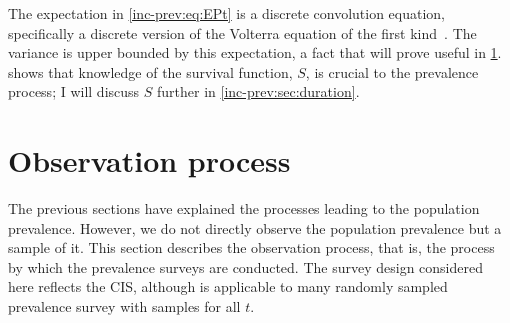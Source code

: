 \documentclass[thesis.tex]{subfiles}
\begin{document}

The expectation in \cref{inc-prev:eq:EPt} is a discrete convolution equation, specifically a discrete version of the Volterra equation of the first kind~\autocite{brookmeyerBackcalculation}.
The variance is upper bounded by this expectation, a fact that will prove useful in \cref{inc-prev:sec:observation-process}.
 shows that knowledge of the survival function, $S$, is crucial to the prevalence process; I will discuss $S$ further in \cref{inc-prev:sec:duration}.

\section{Observation process} \label{inc-prev:sec:observation-process}

The previous sections have explained the processes leading to the population prevalence.
However, we do not directly observe the population prevalence but a sample of it.
This section describes the observation process, that is, the process by which the prevalence surveys are conducted.
The survey design considered here reflects the CIS, although is applicable to many randomly sampled prevalence survey with samples for all $t$.
\end{document}
